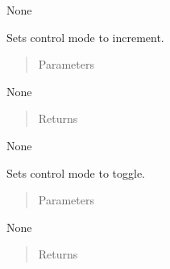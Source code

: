 \documentclass[letterpaper,10pt,english]{sphinxmanual}
\begin{document}
\begin{fulllineitems}
\begin{fulllineitems}
\sphinxAtStartPar
None

\end{fulllineitems}


\begin{fulllineitems}
\label{\detokenize{specific:NeckTiltOutput.NeckTiltOutput.set_control_increment}}
\sphinxAtStartPar
Sets control mode to increment.
\begin{quote}\begin{description}
\item[{Parameters}] \leavevmode
\end{description}\end{quote}

\sphinxAtStartPar
None
\begin{quote}\begin{description}
\item[{Returns}] \leavevmode
\end{description}\end{quote}

\sphinxAtStartPar
None

\end{fulllineitems}


\begin{fulllineitems}
\label{\detokenize{specific:NeckTiltOutput.NeckTiltOutput.set_control_toggle}}
\sphinxAtStartPar
Sets control mode to toggle.
\begin{quote}\begin{description}
\item[{Parameters}] \leavevmode
\end{description}\end{quote}

\sphinxAtStartPar
None
\begin{quote}\begin{description}
\item[{Returns}] \leavevmode
\end{description}\end{quote}


\end{fulllineitems}
\end{fulllineitems}
\end{document}
